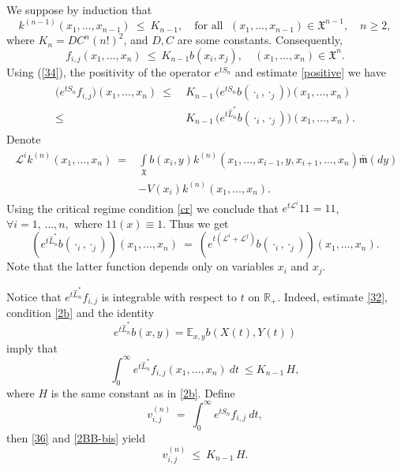 \documentclass[a4paper,12pt]{article}
\newcommand{\R}{{\mathbb R}}
\newcommand{\XXX}{{\mathfrak{X}}}
\begin{document}
We suppose by induction that
$$
k^{(n-1)} (x_1, \ldots, x_{n-1}) \ \le \ K_{n-1}, \quad \text{for all } \; (x_1, \ldots, x_{n-1})\in {\XXX}^{n-1},\quad n\geq 2,
$$
where $K_n = D C^n (n!)^2$, and $D, C$ are some constants. Consequently,
\begin{equation}\label{34}
f_{i,j}(x_1, \ldots, x_n) \ \le \  K_{n-1} b(x_i, x_j),\quad (x_1, \ldots, x_{n})\in {\XXX}^{n}.
\end{equation}
Using (\ref{34}), the positivity of the operator $e^{t S_n}$ and estimate \eqref{positive} we have
\begin{align}
\begin{aligned}\label{36}
\big(e^{t S_n} f_{i,j} \big) (x_1, \ldots, x_{n})\ \le \ &  K_{n-1}\, \big(e^{t S_n}
b(\cdot_i, \cdot_j) \big)(x_1, \ldots, x_{n}) \\  \le \ &  K_{n-1} \, \big( e^{t \hat L_n^{\ast}}
b(\cdot_i, \cdot_j) \big)(x_1, \ldots, x_{n}).
\end{aligned}
\end{align}
Denote
\begin{align}
\begin{aligned}\label{21-bis}
{\mathcal{L}}^{i} k^{(n)}(x_1, \ldots, x_n) \ = &\int\limits_{\XXX} b(x_i, y) k^{(n)}(x_1, \ldots, x_{i-1}, y, x_{i+1}, \ldots,
x_n) \bar{\mathfrak{m}}( dy)\\
& - V(x_i) k^{(n)}(x_1, \ldots, x_n).
\end{aligned}
\end{align}
Using the critical regime condition \eqref{cr} we conclude that $e^{t {\mathcal{L}}^{i}}1\!\!1=1\!\!1$, $\forall i=1,\,\ldots, n,$ where
 $1\!\!1(x)\equiv 1$. Thus we get
\begin{equation}\label{36_1}
\left(e^{t \hat L_n^{\ast}}
b(\cdot_i, \cdot_j)\right) (x_1, \ldots, x_{n})\  =  \
\left(e^{t ( {\mathcal{L}}^i + {\mathcal{L}}^j)} b(\cdot_i, \cdot_j)\right) (x_1, \ldots, x_{n}).
\end{equation}
Note that the latter function depends only on variables $x_{i}$ and $x_{j}$.
\medskip

Notice that $e^{t \hat L_n^{\ast}} f_{i,j}$ is integrable with respect to $t$ on $\R_{+}$. Indeed, estimate \eqref{32}, condition \eqref{2b} and the identity
\begin{equation}\label{2BB}
 e^{t \hat L_n^{\ast}} b(x,y)   =   \mathbb{E}_{x,y} b(X(t), Y(t))
\end{equation}
imply that
\begin{equation}\label{2BB-bis}
\int_0^{\infty} e^{t \hat L_n^{\ast}} f_{i,j}(x_1, \ldots, x_{n}) \ dt \
\le  K_{n-1} \, H,
\end{equation}
where $H$ is the same constant as in \eqref{2b}.
Define
\begin{equation}\label{vij}
v^{(n)}_{i,j} \ = \ \int_0^{\infty} e^{t S_n} f_{i,j} \ dt,
\end{equation}
then    \eqref{36} and \eqref{2BB-bis} yield
\begin{equation}\label{vij-est}
v^{(n)}_{i,j} \ \le \ K_{n-1} \, H.
\end{equation}
\medskip
\end{document}
